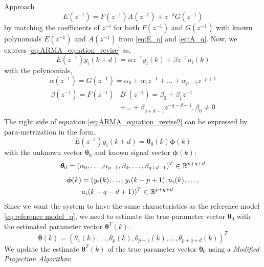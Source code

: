\begin{section}{Approach}
    \begin{equation}
    \label{eq:Start}
	E(z^{-1})=F(z^{-1})A(z^{-1})+z^{-d}G(z^{-1})
	\end{equation}
by matching the coefficients of $z^{-i}$ for both $F(z^{-1})$ and $G(z^{-1})$ with known polynomials $E(z^{-1})$ and $A(z^{-1})$ from \eqref{eq:E_q} and \eqref{eq:A_q}.
Now, we express \eqref{eq:ARMA_equation_revise} as,
	\begin{equation}
	\label{eq:ARMA_equation_revise2}
	E(z^{-1})y_i(k+d)={\alpha}z^{-1}y_i(k) + {\beta}z^{-1}u_i(k)
	\end{equation}
with the polynomials,
	\begin{equation}
	\alpha(z^{-1})=G(z^{-1})=\alpha_0+\alpha_1z^{-1}+ \dots +\alpha_{p-1}z^{-p+1}
	\end{equation}
	\begin{align}
	\begin{split}
	\beta( z^{-1})= F(z^{-1})&B^{'}(z^{-1})=\beta_0+\beta_1z^{-1} \\
	& + \dots +\beta_{q+d-1}z^{-q-d+1}, \beta_0\neq0
	\end{split}
	\end{align}
The right side of equation \eqref{eq:ARMA_equation_revise2} can be expressed by para-metrization in the form,
    \begin{equation}
	E(z^{-1})y_i(k+d)=\bm{\theta}_0(k)\bm{\phi}(k)
	\end{equation}
with the unknown vector $\bm{\theta}_0$ and known signal vector $\bm{\phi}(k)$:
    \begin{equation}
	\bm{\theta}_0=(\alpha_0, \dots ,\alpha_{p-1},\beta_0, \dots ,\beta_{q+d-1})^T \in \mathbb{R}^{p+q+d}
	\end{equation}
	\begin{align}
	\begin{split}
	\bm{\phi}(k)&=(y_i(k), \dots ,y_i(k-p+1),u_i(k), \dots , \\
	& u_i(k-q-d+1))^T \in \mathbb{R}^{p+q+d}
	\end{split}
	\end{align}
Since we want the system to have the same characteristics as the reference model \eqref{eq:reference model_q}, we need to estimate the true parameter vector $\bm{\theta}_0$ with the estimated parameter vector $\bm{\theta}^T(k)$. 
    \begin{equation}
    \bm{\theta}(k)=(\theta_1(k), \dots ,\theta_p(k),\theta_{p+1}(k), \dots ,\theta_{p+q+d}(k))^T
	\end{equation}
We update the estimate $\bm{\theta}^T(k)$ of the true parameter vector $\bm{\theta}_0$ using a \textit{Modified Projection Algorithm}:

\end{section}
